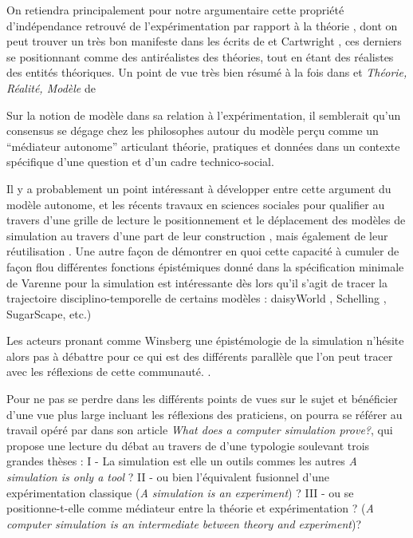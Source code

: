 On retiendra principalement pour notre argumentaire cette propriété d'indépendance retrouvé de l'expérimentation par rapport à la théorie , dont on peut trouver un très bon manifeste dans les écrits de \textcite{Hacking1983} et Cartwright , ces derniers se positionnant comme des antiréalistes des théories, tout en étant des réalistes des entités théoriques. Un point de vue très bien résumé à la fois dans \textcite{Hacking1983} et \textit{Théorie, Réalité, Modèle} de \textcite[226-231]{Varenne2012}

Sur la notion de modèle dans sa relation à l'expérimentation, il semblerait qu'un consensus se dégage chez les philosophes \autocites{Morgan2009, Varenne2013} autour du modèle perçu comme un \enquote{médiateur autonome} articulant théorie, pratiques et données dans un contexte spécifique d'une question et d'un cadre technico-social. \autocite[2]{Phan2010}

Il y a probablement un point intéressant à développer entre cette argument du modèle autonome, et les récents travaux en sciences sociales pour qualifier au travers d'une grille de lecture \autocites{Banos2013a, Sanders2013} le positionnement \autocites{Banos2013, Schmitt2013} et le déplacement des modèles de simulation au travers d'une part de leur construction \autocite{Cottineau2014b}, mais également de leur réutilisation \autocite{Schmitt2014}. Une autre façon de démontrer en quoi cette capacité à cumuler de façon flou différentes fonctions épistémiques donné dans la spécification minimale de Varenne pour la simulation \autocite{Varenne2013} est intéressante dès lors qu'il s'agit de tracer la trajectoire disciplino-temporelle de certains modèles : daisyWorld \autocite{Dutreuil2013}, Schelling \autocite {Bulle2005}, SugarScape, etc.)


Les acteurs pronant comme Winsberg une épistémologie de la simulation n'hésite alors pas à débattre pour ce qui est des différents parallèle que l'on peut tracer avec les réflexions de cette communauté. .

Pour ne pas se perdre dans les différents points de vues sur le sujet et bénéficier d'une vue plus large incluant les réflexions des praticiens, on pourra se référer au travail opéré par \textcite{Varenne2001} dans son article \textit{What does a computer simulation prove?}, qui propose une lecture du débat au travers de d'une typologie soulevant trois grandes thèses : I - La simulation est elle un outils commes les autres \textit{A simulation is only a tool} ? II - ou bien l'équivalent fusionnel d'une expérimentation classique (\textit{A simulation is an experiment}) ? III - ou se positionne-t-elle comme médiateur entre la théorie et expérimentation ? (\textit{A computer simulation is an intermediate between theory and experiment})? 


